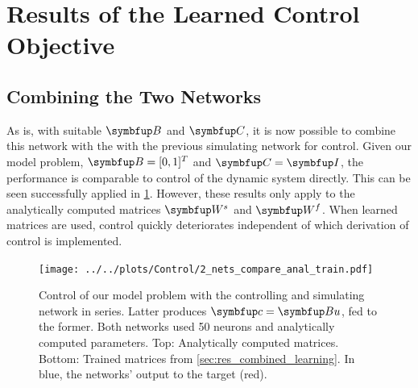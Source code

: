 \section{Results of the Learned Control Objective}\label{sec:res_total}

\subsection{Combining the Two Networks}\label{ssec:combining-2-network}
As is, with suitable $\bmu{B}$ and $\bmu{C}$, it is now possible to combine this network with the with the previous simulating network for control. Given our model problem, $\bmu{B} = [0,1]^T$ and $\bmu{C} = \bmu{I}$, the performance is comparable to control of the dynamic system directly. This can be seen successfully applied in \cref{fig:2_connected_control}. However, these results only apply to the analytically computed matrices $\bmu{W}^s$ and $\bmu{W}^f$.  When learned matrices are used, control quickly deteriorates independent of which derivation of control is implemented.\\
\begin{figure}
	\centering
	\texttt{[image: ../../plots/Control/2\_nets\_compare\_anal\_train.pdf]}
	\caption{Control of our model problem with the controlling and simulating network in series. Latter produces $\bmu{c} = \bmu{Bu}$, fed to the former. Both networks used 50 neurons and analytically computed parameters. Top: Analytically computed matrices. Bottom: Trained matrices from \cref{sec:res_combined_learning}. In blue, the networks' output to the target (red).}
	\label{fig:2_connected_control}
\end{figure}

